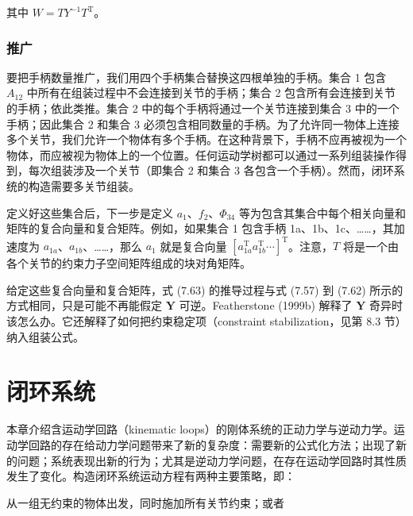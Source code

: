 \documentclass[10pt,a4paper]{book}
\theoremstyle{thmstyle} %
\theoremstyle{defstyle} %
\theoremstyle{prostyle} %
\begin{document}
其中 $W = TY^{-1}T^{\mathrm{T}}$。



\subsection{推广}





要把手柄数量推广，我们用四个手柄集合替换这四根单独的手柄。集合 1 包含 $A_{12}$ 中所有在组装过程中不会连接到关节的手柄；集合 2 包含所有会连接到关节的手柄；依此类推。集合 2 中的每个手柄将通过一个关节连接到集合 3 中的一个手柄；因此集合 2 和集合 3 必须包含相同数量的手柄。为了允许同一物体上连接多个关节，我们允许一个物体有多个手柄。在这种背景下，手柄不应再被视为一个物体，而应被视为物体上的一个位置。任何运动学树都可以通过一系列组装操作得到，每次组装涉及一个关节（即集合 2 和集合 3 各包含一个手柄）。然而，闭环系统的构造需要多关节组装。



定义好这些集合后，下一步是定义 $a_{1}$、$f_{2}$、$\Phi_{34}$ 等为包含其集合中每个相关向量和矩阵的复合向量和复合矩阵。例如，如果集合 1 包含手柄 1a、1b、1c、……，其加速度为 $a_{1a}$、$a_{1b}$、……，那么 $a_{1}$ 就是复合向量 $[a_{1a}^{\mathrm{T}} a_{1b}^{\mathrm{T}} \cdots]^{\mathrm{T}}$。注意，$T$ 将是一个由各个关节的约束力子空间矩阵组成的块对角矩阵。



给定这些复合向量和复合矩阵，式 (7.63) 的推导过程与式 (7.57) 到 (7.62) 所示的方式相同，只是可能不再能假定 $\mathbf{Y}$ 可逆。Featherstone (1999b) 解释了 $\mathbf{Y}$ 奇异时该怎么办。它还解释了如何把约束稳定项（constraint stabilization，见第 8.3 节）纳入组装公式。



\chapter{闭环系统}







本章介绍含运动学回路（kinematic loops）的刚体系统的正动力学与逆动力学。运动学回路的存在给动力学问题带来了新的复杂度：需要新的公式化方法；出现了新的问题；系统表现出新的行为；尤其是逆动力学问题，在存在运动学回路时其性质发生了变化。构造闭环系统运动方程有两种主要策略，即：



从一组无约束的物体出发，同时施加所有关节约束；或者
\end{document}
